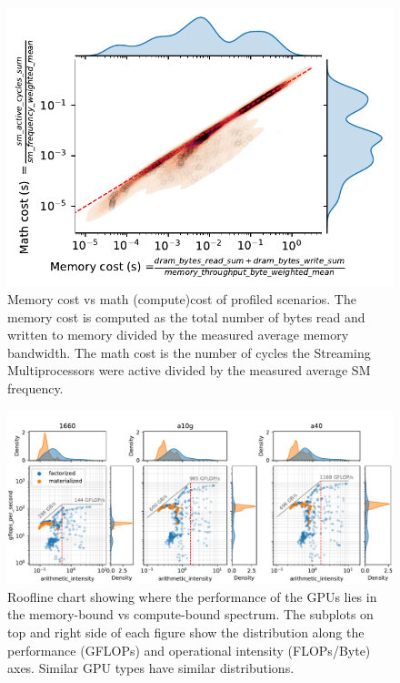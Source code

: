 \begin{figure}[h]
    \centering
    \includegraphics[width=0.5\linewidth]{chapters/05_cost_estimation/figures/profiling-mem-vs-compute.pdf}
    \caption[Memory cost vs math cost of profiled scenarios]{Memory cost vs math (compute)cost of profiled scenarios. The memory cost is computed as the total number of bytes read and written to memory divided by the measured average memory bandwidth. The math cost is the number of cycles the Streaming Multiprocessors were active divided by the measured average SM frequency.}
    \label{fig:5-profiling-mem-vs-compute}
\end{figure}



\begin{figure}
    \centering
    \includegraphics[width=\linewidth]{chapters/05_cost_estimation/figures/roofline-plot.pdf}
    \caption[Roofline chart comparing F/M, per GPU]{Roofline chart showing where the performance of the GPUs lies in the memory-bound vs compute-bound spectrum. The subplots on top and right side of each figure show the distribution along the performance (GFLOPs) and operational intensity (FLOPs/Byte) axes. Similar GPU types have similar distributions. }
    \label{fig:5-roofline-plot}
\end{figure}

